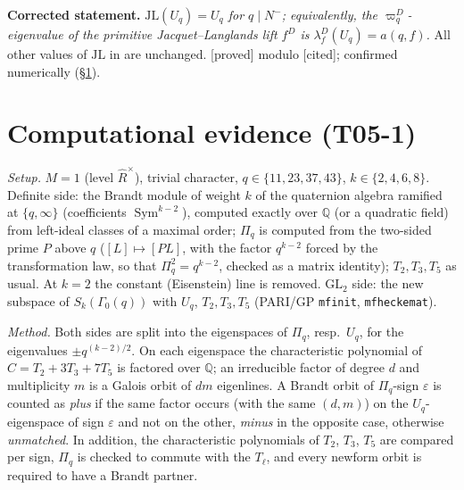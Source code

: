 \documentclass[11pt]{amsart}
\theoremstyle{plain}
\theoremstyle{remark}
\newcommand{\Q}{\mathbb{Q}}
\newcommand{\JL}{\mathrm{JL}}
\newcommand{\GL}{\mathrm{GL}}
\newcommand{\st}[1]{\textup{\textsf{[#1]}}}
\begin{document}
\noindent\textbf{Corrected statement.} \emph{$\JL(U_q)=U_q$ for $q\mid N^-$; equivalently, the $\varpi^D_q$-eigenvalue of
the primitive Jacquet--Langlands lift $f^D$ is $\lambda^D_f(U_q)=a(q,f)$.} All other values of $\JL$ in \cite[p.~34]{Hs}
are unchanged. \st{proved} modulo \st{cited}; confirmed numerically (\S\ref{s:comp}).

\section{Computational evidence (T05-1)}\label{s:comp}
\emph{Setup.} $M=1$ (level $\widehat R^\times$), trivial character, $q\in\{11,23,37,43\}$, $k\in\{2,4,6,8\}$. Definite side:
the Brandt module of weight $k$ of the quaternion algebra ramified at $\{q,\infty\}$ (coefficients
$\operatorname{Sym}^{k-2}$), computed exactly over $\Q$ (or a quadratic field) from left-ideal classes of a maximal order;
$\Pi_q$ is computed from the two-sided prime $P$ above $q$ ($[L]\mapsto[PL]$, with the factor $q^{k-2}$ forced by the
transformation law, so that $\Pi_q^2=q^{k-2}$, checked as a matrix identity); $T_2,T_3,T_5$ as usual. At $k=2$ the
constant (Eisenstein) line is removed. $\GL_2$ side: the new subspace of $S_k(\Gamma_0(q))$ with $U_q$, $T_2,T_3,T_5$
(PARI/GP \texttt{mfinit}, \texttt{mfheckemat}).

\emph{Method.} Both sides are split into the eigenspaces of $\Pi_q$, resp.\ $U_q$, for the eigenvalues $\pm q^{(k-2)/2}$.
On each eigenspace the characteristic polynomial of $C=T_2+3T_3+7T_5$ is factored over $\Q$; an irreducible factor of
degree $d$ and multiplicity $m$ is a Galois orbit of $dm$ eigenlines. A Brandt orbit of $\Pi_q$-sign $\varepsilon$ is
counted as \emph{plus} if the same factor occurs (with the same $(d,m)$) on the $U_q$-eigenspace of sign $\varepsilon$ and
not on the other, \emph{minus} in the opposite case, otherwise \emph{unmatched}. In addition, the characteristic polynomials
of $T_2$, $T_3$, $T_5$ are compared per sign, $\Pi_q$ is checked to commute with the $T_\ell$, and every newform orbit is
required to have a Brandt partner.
\end{document}
